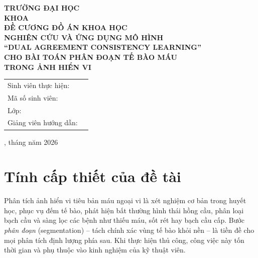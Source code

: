 \documentclass[12pt,a4paper]{article}
\begin{document}
\begin{titlepage}
  \centering
  {\large \textbf{TRƯỜNG ĐẠI HỌC \underline{\hspace{6cm}}}}\\[2pt]
  {\large \textbf{KHOA \underline{\hspace{6cm}}}}\\[2.5cm]

  {\Large \textbf{ĐỀ CƯƠNG ĐỒ ÁN KHOA HỌC}}\\[1.5cm]

  {\LARGE \textbf{NGHIÊN CỨU VÀ ỨNG DỤNG MÔ HÌNH\\[4pt]
  ``DUAL AGREEMENT CONSISTENCY LEARNING''\\[4pt]
  CHO BÀI TOÁN PHÂN ĐOẠN TẾ BÀO MÁU\\[4pt]
  TRONG ẢNH HIỂN VI}}\\[3cm]

  \begin{tabular}{ll}
    Sinh viên thực hiện: & \underline{\hspace{6cm}} \\[4pt]
    Mã số sinh viên:     & \underline{\hspace{6cm}} \\[4pt]
    Lớp:                 & \underline{\hspace{6cm}} \\[4pt]
    Giảng viên hướng dẫn:& \underline{\hspace{6cm}} \\
  \end{tabular}

  \vfill
  {\large \underline{\hspace{2.5cm}}, tháng \underline{\hspace{1cm}} năm 2026}
\end{titlepage}

\tableofcontents
\newpage

\section{Tính cấp thiết của đề tài}

Phân tích ảnh hiển vi tiêu bản máu ngoại vi là xét nghiệm cơ bản trong huyết học,
phục vụ đếm tế bào, phát hiện bất thường hình thái hồng cầu, phân loại bạch cầu và
sàng lọc các bệnh như thiếu máu, sốt rét hay bạch cầu cấp. Bước \emph{phân đoạn}
(segmentation) -- tách chính xác vùng tế bào khỏi nền -- là tiền đề cho mọi phân tích
định lượng phía sau. Khi thực hiện thủ công, công việc này tốn thời gian và phụ thuộc
vào kinh nghiệm của kỹ thuật viên.
\end{document}
